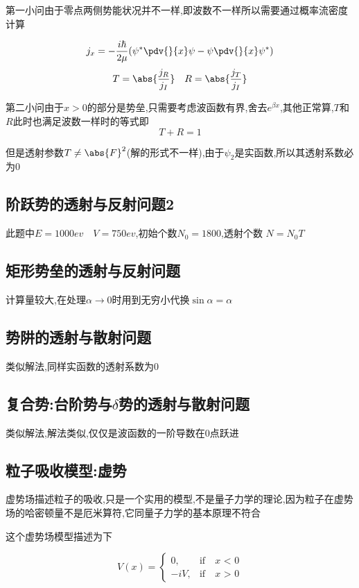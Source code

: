             第一小问由于零点两侧势能状况并不一样,即波数不一样所以需要通过概率流密度计算

            $$ j_{x} = -\frac{i\hbar}{2\mu} (\psi^{*} \pdv{}{x} \psi - \psi \pdv{}{x} \psi^{*} ) $$
            $$ T = \abs{\frac{j_{R}}{j_{I}}} \quad R = \abs{\frac{j_{T}}{j_{I}}} $$

            第二小问由于$x>0$的部分是势垒,只需要考虑波函数有界,舍去$e^{\beta x}$,其他正常算,$T$和$R$此时也满足波数一样时的等式即
            $$ T + R = 1  $$
            
            但是透射参数$T \neq \abs{F}^{2}$(解的形式不一样),由于$\psi_{2}$是实函数,所以其透射系数必为0
            
            
        \subsection{阶跃势的透射与反射问题2}
            此题中$ E = 1000ev \quad V = 750ev $,初始个数$ N_{0} = 1800 $,透射个数 $ N = N_{0} T $

        \subsection{矩形势垒的透射与反射问题}
            计算量较大,在处理$ \alpha \to 0 $时用到无穷小代换$ \sin{\alpha} = \alpha $

        \subsection{势阱的透射与散射问题}
            类似解法,同样实函数的透射系数为0
        
        \subsection{复合势:台阶势与\texorpdfstring{$\delta$}{}势的透射与散射问题}
            类似解法,解法类似,仅仅是波函数的一阶导数在0点跃进

        
        \subsection{粒子吸收模型:虚势}
            虚势场描述粒子的吸收,只是一个实用的模型,不是量子力学的理论,因为粒子在虚势场的哈密顿量不是厄米算符,它同量子力学的基本原理不符合

            这个虚势场模型描述为下

            $$ V(x) =
            \begin{cases}
            0, & \mbox{if} \quad x \mbox{ < 0} \\
            -iV , & \mbox{if} \quad x \mbox{ > 0}
            \end{cases}  $$

